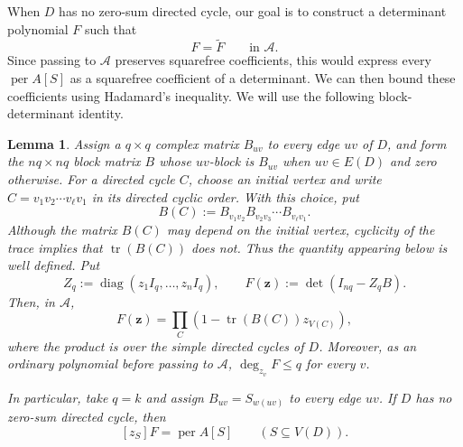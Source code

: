 \documentclass[11pt]{amsart}
\newtheorem{lemma}[theorem]{Lemma}
\theoremstyle{remark}
\newcommand{\per}{\operatorname{per}}
\newcommand{\tr}{\operatorname{tr}}
\newcommand{\diag}{\operatorname{diag}}
\begin{document}
When $D$ has no zero-sum directed cycle, our goal is to construct a
determinant polynomial $F$ such that
\[
  F=\widetilde F\qquad\text{in }\mathcal A.
\]
Since passing to $\mathcal A$ preserves squarefree coefficients, this
would express every $\per A[S]$ as a squarefree coefficient of a
determinant.  We can then bound these coefficients using Hadamard's
inequality.  We will use the following block-determinant identity.
\begin{lemma}\label{lem:cycle-product}
Assign a $q\times q$ complex matrix $B_{uv}$ to every edge $uv$ of
$D$, and form the $nq\times nq$ block matrix $B$ whose $uv$-block is
$B_{uv}$ when $uv\in E(D)$ and zero otherwise.  For a directed cycle
$C$, choose an initial vertex and write
$C=v_1v_2\cdots v_\ell v_1$ in its directed cyclic order.  With this
choice, put
\[
  B(C):=B_{v_1v_2}B_{v_2v_3}\cdots B_{v_\ell v_1}.
\]
Although the matrix $B(C)$ may depend on the initial vertex, cyclicity
of the trace implies that $\tr(B(C))$ does not.  Thus the quantity
appearing below is well defined.  Put
\[
  Z_q:=\diag(z_1I_q,\ldots,z_nI_q),
  \qquad
  F(\mathbf z):=\det(I_{nq}-Z_qB).
\]
Then, in $\mathcal A$,
\[
  F(\mathbf z)
  =
  \prod_C
  \left(1-\tr(B(C))z_{V(C)}\right),
\]
where the product is over the simple directed cycles of $D$.
Moreover, as an ordinary polynomial before passing to $\mathcal A$,
$\deg_{z_v}F\le q$ for every $v$.

In particular, take $q=k$ and assign $B_{uv}=S_{w(uv)}$ to every edge
$uv$.  If $D$ has no zero-sum directed cycle, then
\[
  [z_S]F=\per A[S]
  \qquad(S\subseteq V(D)).
\]
\end{lemma}
\end{document}
